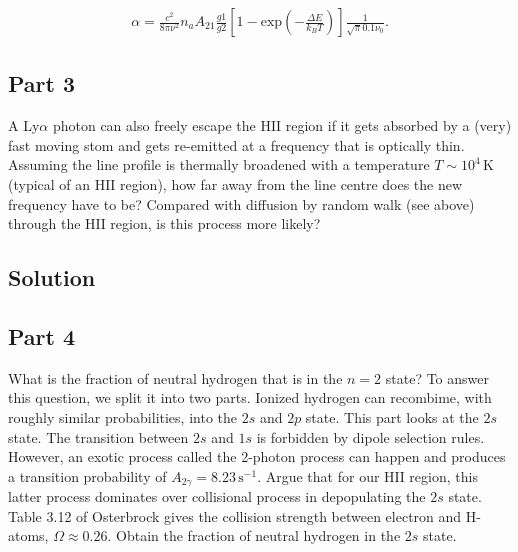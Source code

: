 \documentclass[12pt]{article}
\begin{document}
\begin{align}
\alpha = \frac{c^2}{8\pi\nu^2}n_aA_{21}\frac{g1}{g2}\left[ 1 - \mathrm{exp}\left(-\frac{{\Delta}E}{k_BT}\right)\right] \frac{1}{\sqrt{\pi}0.1\nu_0}.
\end{align}


\subsection*{Part 3}

A Ly$\alpha$ photon can also freely escape the $\mathrm{HII}$ region if it gets absorbed by a (very) fast moving stom and gets re-emitted at a frequency that is optically thin. Assuming the line profile is thermally broadened with a temperature $T \sim 10^4\,\mathrm{K}$ (typical of an $\mathrm{HII}$ region), how far away from the line centre does the new frequency have to be? Compared with diffusion by random walk (see above) through the $\mathrm{HII}$ region, is this process more likely?


\subsection*{Solution}




\subsection*{Part 4}

What is the fraction of neutral hydrogen that is in the $n=2$ state? To answer this question, we split it into two parts. Ionized hydrogen can recombime, with roughly similar probabilities, into the $2s$ and $2p$ state. This part looks at the $2s$ state. The transition between $2s$ and $1s$ is forbidden by dipole selection rules. However, an exotic process called the 2-photon process can happen and produces a transition probability of $A_{2\gamma} = 8.23\,\mathrm{s^{-1}}$. Argue that for our $\mathrm{HII}$ region, this latter process dominates over collisional process in depopulating the $2s$ state. Table 3.12 of Osterbrock gives the collision strength between electron and H-atoms, $\Omega\approx0.26$. Obtain the fraction of neutral hydrogen in the $2s$ state.
\end{document}
